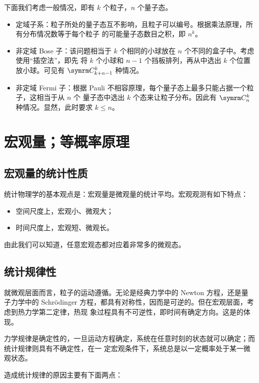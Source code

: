 下面我们考虑一般情况，即有 $k$ 个粒子，$n$ 个量子态。

\begin{itemize}
  \item 定域子系：粒子所处的量子态互不影响，且粒子可以编号。根据乘法原理，所有分布情况数等于每个粒子
    的可能量子态数目之积，即 $n^k$。
  \item 非定域 Bose 子：该问题相当于 $k$ 个相同的小球放在 $n$ 个不同的盒子中。考虑使用“插空法”，即先
    将 $k$ 个小球和 $n-1$ 个挡板排列，再从中选出 $k$ 个位置放小球。可见有 $\Cnum{k+n-1}{k}$ 种情况。
  \item 非定域 Fermi 子：根据 Pauli 不相容原理，每个量子态上最多只能占据一个粒子，这相当于从 $n$ 个
    量子态中选出 $k$ 个态来让粒子分布。因此有 $\Cnum{n}{k}$ 种情况。显然，此时要求 $k \leqslant n$。
\end{itemize}

\section{宏观量；等概率原理}

\subsection{宏观量的统计性质}

统计物理学的基本观点是：宏观量是微观量的统计平均。宏观观测有如下特点：

\begin{itemize}
  \item 空间尺度上，宏观小、微观大；
  \item 时间尺度上，宏观短、微观长。
\end{itemize}

由此我们可以知道，任意宏观态都对应着非常多的微观态。

\subsection{统计规律性}

就微观层面而言，粒子的运动遵循。无论是经典力学中的 Newton 方程，还是量子力学中的
Schrödinger 方程，都具有对称性，因而是可逆的。但在宏观层面，考虑到热力学第二定律，热现
象过程具有不可逆性，即时间有确定方向。这是的体现。

力学规律是确定性的，一旦运动方程确定，系统在任意时刻的状态就可以确定；而统计规律则具有不确定性，在一
定宏观条件下，系统总是以一定概率处于某一微观状态。

造成统计规律的原因主要有下面两点：

